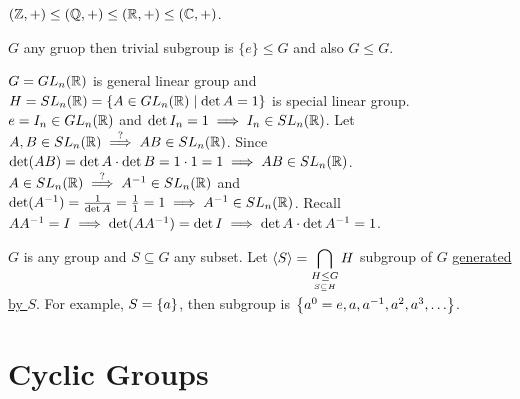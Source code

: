 \documentclass[]{article}
\begin{document}
\begin{example}
	$(\mathbb{Z},+)\leq (\mathbb{Q},+)\leq(\mathbb{R},+)\leq(\mathbb{C},+)$.
\end{example}
\begin{example}
	$G$ any gruop then trivial subgroup is $\{e\}\leq G$ and also $G\leq G$.
\end{example}
\begin{example}
	$G = GL_n(\mathbb{R})$ is general linear group and $H = SL_n(\mathbb{R}) = \{A\in GL_n(\mathbb{R}) \mid \det A = 1\}$ is special linear group.
	$e = I_n\in GL_n(\mathbb{R})$ and $\det I_n = 1 \implies I_n\in SL_n(\mathbb{R})$.
	Let $A,B\in SL_n(\mathbb{R}) \overset{?}{\implies} AB\in SL_n(\mathbb{R})$. Since $\det(AB) = \det A \cdot \det B = 1\cdot 1 = 1 \implies AB\in SL_n(\mathbb{R})$.
	$A\in SL_n(\mathbb{R}) \overset{?}{\implies} A^{-1}\in SL_n(\mathbb{R})$ and $\det(A^{-1}) = \frac{1}{\det A} = \frac{1}{1} = 1\implies A^{-1}\in SL_n(\mathbb{R})$. Recall $AA^{-1} = I \implies \det(AA^{-1}) = \det I \implies \det A\cdot \det A^{-1} = 1$.
\end{example}
\begin{example}
	$G$ is any group and $S\subseteq G$ any subset.
	Let $\displaystyle \langle S \rangle = \bigcap_{\underset{S\subseteq H}{H\leq G}} H$ subgroup of $G$ \ul{generated by $S$}. For example, $S = \left\{ a \right\}$, then subgroup is $\set{a^0=e,a,a\inv,a^2,a^3,\dots}$.
\end{example}

\section{Cyclic Groups}
\end{document}
